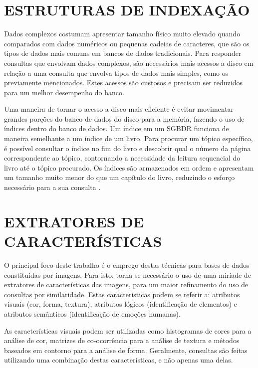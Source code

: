 \section{ESTRUTURAS DE INDEXAÇÃO} %
\label{sec:index}
Dados complexos costumam apresentar tamanho físico muito elevado quando comparados com dados numéricos ou pequenas cadeias de caracteres, que são os tipos de dados
mais comuns em bancos de dados tradicionais. Para responder consultas que envolvam dados complexos, são necessários mais acessos a disco em relação a uma consulta
que envolva tipos de dados mais simples, como os previamente mencionados. Estes acessos são custosos e precisam ser reduzidos para um melhor desempenho do banco.\par 

Uma maneira de tornar o acesso a disco mais eficiente é evitar movimentar grandes porções do banco de dados do disco para a memória, fazendo o uso de índices dentro do banco de dados. 
Um índice em um SGBDR funciona de maneira semelhante a um índice de um livro. Para procurar um tópico específico, é possível consultar o índice no fim do livro e descobrir qual o número da página
correspondente ao tópico, contornando a necessidade da leitura sequencial do livro até o tópico procurado. Os índices são armazenados em ordem e apresentam um tamanho
muito menor do que um capítulo do livro, reduzindo o esforço necessário para a sua consulta \cite{Silberschatz2011}.\par

\section{EXTRATORES DE CARACTERÍSTICAS}
\label{sec:extcarac}
O principal foco deste trabalho é o emprego destas técnicas para bases de dados constituídas por imagens. Para isto, torna-se necessário o uso de uma miríade de extratores de características
das imagens, para um maior refinamento do uso de consultas por similaridade. Estas características podem se referir a: atributos visuais (cor, forma, textura), atributos lógicos (identificação
de elementos) e atributos semânticos (identificação de emoções humanas).\par

As características visuais podem ser utilizadas como histogramas de cores para a análise de cor, matrizes de co-ocorrência para a análise de textura e
métodos baseados em contorno para a análise de forma. Geralmente, consultas são feitas utilizando uma combinação destas características, e não apenas uma delas.\par

